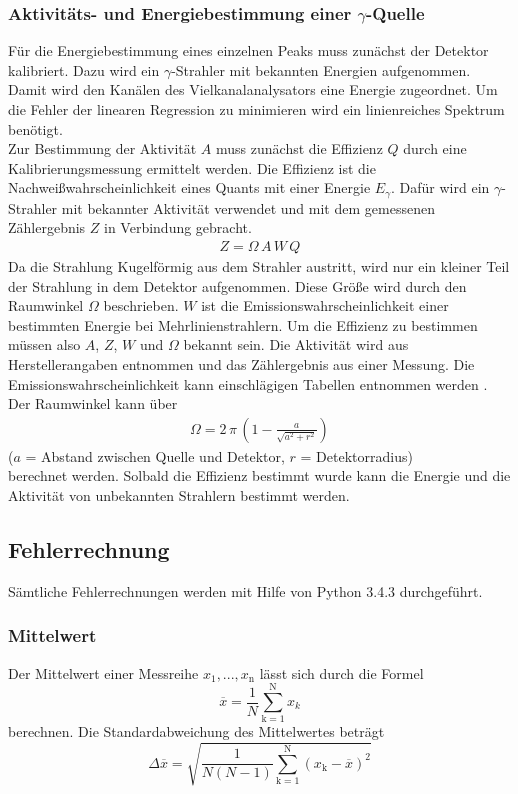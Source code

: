 \subsubsection{Aktivitäts- und Energiebestimmung einer \texorpdfstring{$\gamma$}{}-Quelle}
Für die Energiebestimmung eines einzelnen Peaks muss zunächst der Detektor kalibriert. Dazu wird ein $\gamma$-Strahler mit bekannten Energien aufgenommen. Damit wird den Kanälen des Vielkanalanalysators eine Energie zugeordnet. Um die Fehler der linearen Regression zu minimieren wird ein linienreiches Spektrum benötigt. \\
Zur Bestimmung der Aktivität $A$ muss zunächst die Effizienz $Q$ durch eine Kalibrierungsmessung ermittelt werden. Die Effizienz ist die Nachweißwahrscheinlichkeit eines Quants mit einer Energie $E_\gamma$. Dafür wird ein $\gamma$-Strahler mit bekannter Aktivität verwendet und mit dem gemessenen Zählergebnis $Z$ in Verbindung gebracht.
\begin{align}
	Z = \Omega\,A\,W\,Q
\end{align}
Da die Strahlung Kugelförmig aus dem Strahler austritt, wird nur ein kleiner Teil der Strahlung in dem Detektor aufgenommen. Diese Größe wird durch den Raumwinkel $\Omega$ beschrieben. $W$ ist die Emissionswahrscheinlichkeit einer bestimmten Energie bei Mehrlinienstrahlern. Um die Effizienz zu bestimmen müssen also $A$, $Z$, $W$ und $\Omega$ bekannt sein. Die Aktivität wird aus Herstellerangaben entnommen und das Zählergebnis aus einer Messung. Die Emissionswahrscheinlichkeit kann einschlägigen Tabellen entnommen werden \cite{V18}. Der Raumwinkel kann über
\begin{align}
	\Omega = 2\,\pi\,\left(1 - \frac{a}{\sqrt{a^2 + r^2}} \right)
\end{align}
\hfil {\footnotesize($a$ = Abstand zwischen Quelle und Detektor, $r$ = Detektorradius)} \hfil \\
berechnet werden. Solbald die Effizienz bestimmt wurde kann die Energie und die Aktivität von unbekannten Strahlern bestimmt werden.









\subsection{Fehlerrechnung}
Sämtliche Fehlerrechnungen werden mit Hilfe von Python 3.4.3 durchgeführt.
\subsubsection{Mittelwert}
Der Mittelwert einer Messreihe $x_\text{1}, ... ,x_\text{n}$ lässt sich durch die Formel
\begin{equation}
	\overline{x} = \frac{1}{N} \sum_{\text{k}=1}^\text{N} x_k
	\label{eqn:ave}
\end{equation}
berechnen. Die Standardabweichung des Mittelwertes beträgt
\begin{equation}
	\Delta \overline{x} = \sqrt{ \frac{1}{N(N-1)} \sum_{\text{k}=1}^\text{N} (x_\text{k} - \overline{x})^2}
	\label{eqn:std}
\end{equation}

